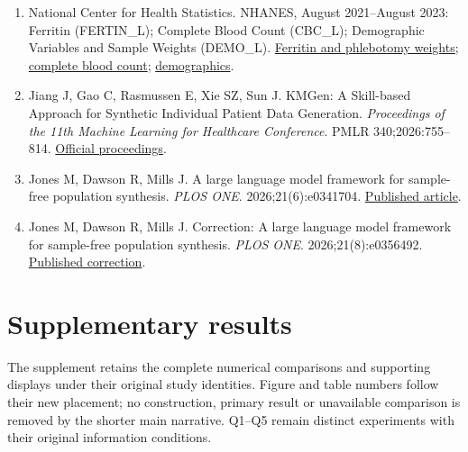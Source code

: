 \documentclass[11pt,letterpaper]{article}
\begin{document}
\begin{enumerate}[label=\arabic*.,leftmargin=2.1em,itemsep=.2em,parsep=0pt]
\item National Center for Health Statistics. NHANES, August 2021–\allowbreak{}August 2023: Ferritin (FERTIN\_L); Complete Blood Count (CBC\_L); Demographic Variables and Sample Weights (DEMO\_L). \href{https://wwwn.cdc.gov/Nchs/Data/Nhanes/Public/2021/DataFiles/FERTIN\_L.htm}{Ferritin and phlebotomy weights}; \href{https://wwwn.cdc.gov/Nchs/Data/Nhanes/Public/2021/DataFiles/CBC\_L.htm}{complete blood count}; \href{https://wwwn.cdc.gov/Nchs/Data/Nhanes/Public/2021/DataFiles/DEMO\_L.htm}{demographics}.

\item Jiang J, Gao C, Rasmussen E, Xie SZ, Sun J. KMGen: A Skill-based Approach for Synthetic Individual Patient Data Generation. \emph{Proceedings of the 11th Machine Learning for Healthcare Conference}. PMLR 340;2026:755–\allowbreak{}814. \href{https://proceedings.mlr.press/v340/jiang26a.html}{Official proceedings}.

\item Jones M, Dawson R, Mills J. A large language model framework for sample-free population synthesis. \emph{PLOS ONE}. 2026;21(6):e0341704. \href{https://journals.plos.org/plosone/article?id=10.1371/journal.pone.0341704}{Published article}.

\item Jones M, Dawson R, Mills J. Correction: A large language model framework for sample-free population synthesis. \emph{PLOS ONE}. 2026;21(8):e0356492. \href{https://journals.plos.org/plosone/article?id=10.1371/journal.pone.0356492}{Published correction}.

\end{enumerate}

\endgroup

\clearpage

\appendix

\section*{Supplementary results}

\setcounter{figure}{0}

\renewcommand{\thefigure}{S\arabic{figure}}

\setcounter{table}{0}

\renewcommand{\thetable}{S\arabic{table}}

The supplement retains the complete numerical comparisons and supporting displays under their original study identities. Figure and table numbers follow their new placement; no construction, primary result or unavailable comparison is removed by the shorter main narrative. Q1–\allowbreak{}Q5 remain distinct experiments with their original information conditions.
\end{document}
